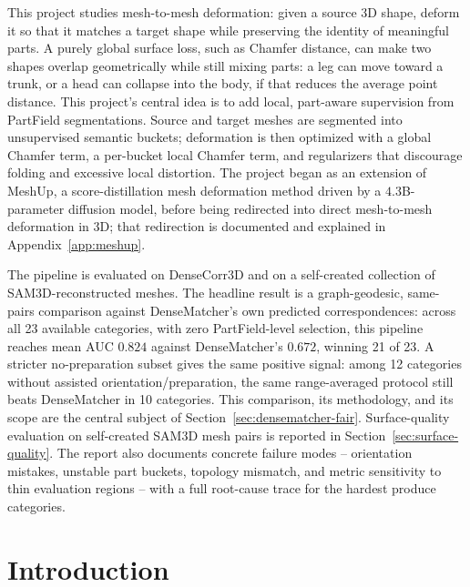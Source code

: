 \documentclass{article}
\newcommand{\AUC}{AUC}
\begin{document}
\begin{center}
\begin{minipage}{0.88\textwidth}
\small
\noindent
This project studies mesh-to-mesh deformation: given a source 3D shape, deform it so that it
matches a target shape while preserving the identity of meaningful parts. A purely global surface
loss, such as Chamfer distance, can make two shapes overlap geometrically while still mixing
parts: a leg can move toward a trunk, or a head can collapse into the body, if that reduces the
average point distance. This project's central idea is to add local, part-aware supervision from
PartField segmentations. Source and target meshes are segmented into unsupervised semantic
buckets; deformation is then optimized with a global Chamfer term, a per-bucket local Chamfer
term, and regularizers that discourage folding and excessive local distortion. The project began
as an extension of MeshUp, a score-distillation mesh deformation method driven by a $4.3$B-parameter
diffusion model, before being redirected into direct mesh-to-mesh deformation in 3D; that redirection 
is documented and explained in Appendix~\ref{app:meshup}.

The pipeline is evaluated on DenseCorr3D and on a self-created collection of SAM3D-reconstructed
meshes. The headline result is a graph-geodesic, same-pairs comparison against DenseMatcher's own
predicted correspondences: across all 23 available categories, with zero PartField-level
selection, this pipeline reaches mean \AUC{} $0.824$ against DenseMatcher's $0.672$, winning 21 of
23. A stricter no-preparation subset gives the same positive signal: among
12 categories without assisted orientation/preparation, the same range-averaged protocol still beats
DenseMatcher in 10 categories. This comparison, its methodology, and its scope are the central subject of
Section~\ref{sec:densematcher-fair}. Surface-quality evaluation on self-created SAM3D mesh pairs is
reported in Section~\ref{sec:surface-quality}. The report also documents concrete failure modes --
orientation mistakes, unstable part buckets, topology mismatch, and metric sensitivity to thin
evaluation regions -- with a full root-cause trace for the hardest produce categories.
\end{minipage}
\end{center}

\newpage
\tableofcontents
\newpage

\section{Introduction}
\end{document}

